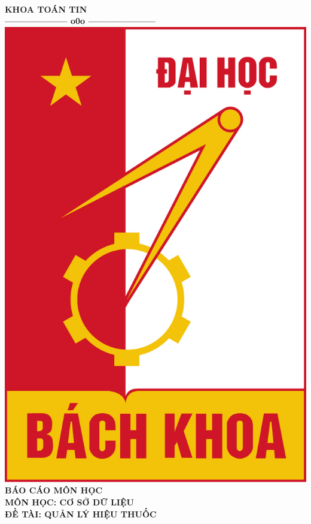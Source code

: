\begin{titlepage}
\begin{center}
        \\[0.25cm]
        \hspace{1.8 cm} {\fontsize{15pt}{1}\selectfont\textbf{KHOA TOÁN TIN}}
	\\		
	\hspace{1.8 cm} \textbf{--------------------  o0o  ---------------------}\\[1cm]
	\hspace{1.8 cm} \includegraphics[scale=0.43]{images/BVP-logo bk-rgb.jpg} \\[1.2cm]
	\hspace{1.8 cm} \textbf{\fontsize{23pt}{0pt} \selectfont BÁO CÁO MÔN HỌC }
\textbf{}\\[0.5cm]
\hspace{1.8 cm} \textbf{\fontsize{17.5pt}{0pt} \selectfont MÔN HỌC: CƠ SỞ DỮ LIỆU }\\
\vspace{0.7cm}
\hspace{1.8 cm} \textbf{\fontsize{20pt}{0pt} \selectfont ĐỀ TÀI: QUẢN LÝ HIỆU THUỐC }\\
\vspace{1.4cm}


\end{center}
\end{titlepage}
